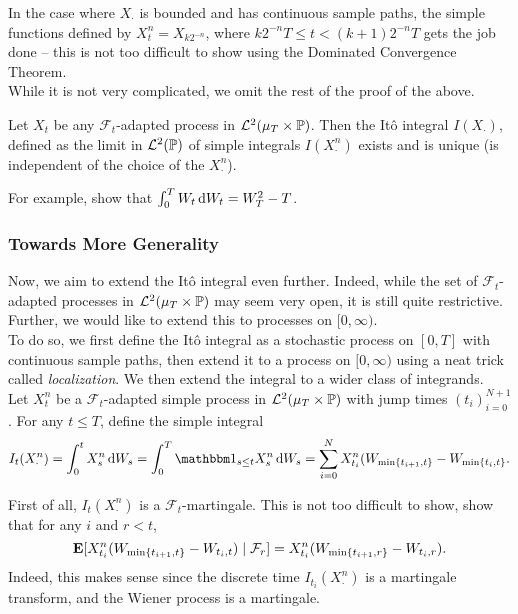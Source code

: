In the case where $X_\cdot$ is bounded and has continuous sample paths, the simple functions defined by $X_t^n = X_{k2^{-n}}$, where $k2^{-n}T \leq t < (k+1)2^{-n}T$ gets the job done -- this is not too difficult to show using the Dominated Convergence Theorem.\\
While it is not very complicated, we omit the rest of the proof of the above.

\begin{definition}
	Let $X_t$ be any $\mathcal{F}_t$-adapted process in $\mathcal{L}^2(\mu_T\times\mathbb{P})$. Then the It\^{o} integral $I(X_\cdot)$, defined as the limit in $\mathcal{L}^2(\mathbb{P})$ of simple integrals $I(X_\cdot^n)$ exists and is unique (is independent of the choice of the $X_\cdot^n$).
\end{definition}

For example, show that $\int_0^T W_t\operatorname{d}\!{W}_t = W_T^2 - T$.

\subsubsection{Towards More Generality}

Now, we aim to extend the It\^{o} integral even further. Indeed, while the set of $\mathcal{F}_t$-adapted processes in $\mathcal{L}^2(\mu_T\times\mathbb{P})$ may seem very open, it is still quite restrictive. Further, we would like to extend this to processes on $[0,\infty)$.\\
To do so, we first define the It\^{o} integral as a stochastic process on $[0,T]$ with continuous sample paths, then extend it to a process on $[0,\infty)$ using a neat trick called \textit{localization}. We then extend the integral to a wider class of integrands.\\

Let $X^n_t$ be a $\mathcal{F}_t$-adapted simple process in $\mathcal{L}^2(\mu_T\times\mathbb{P})$ with jump times $(t_i)_{i=0}^{N+1}$. For any $t\leq T$, define the simple integral
\[ I_t(X^n_\cdot) = \int_0^t X_s^n \d{W}_s = \int_0^T \indic_{s\leq t} X_s^n \d{W}_s = \sum_{i=0}^N X_{t_i}^n (W_{\min\{t_{i+1}, t\}} - W_{\min\{t_i,t\}}. \]

First of all, $I_t(X^n_\cdot)$ is a $\mathcal{F}_t$-martingale. This is not too difficult to show, show that for any $i$ and $r<t$,
\[ \textbf{E}[X_{t_i}^n(W_{\min\{t_{i+1},t\}} - W_{t_{i},t}) \mid \mathcal{F}_r] = X_{t_i}^n (W_{\min\{t_{i+1},r\}} - W_{t_{i},r}). \]
Indeed, this makes sense since the discrete time $I_{t_i}(X^n_\cdot)$ is a martingale transform, and the Wiener process is a martingale.

